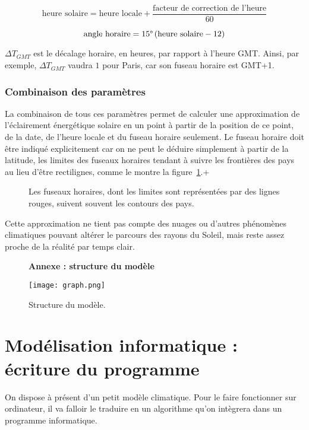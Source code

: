 \documentclass[12pt]{article}
\begin{document}
\[
	\text{heure solaire} = \text{heure locale} + \frac{\text{facteur de correction de l'heure}}{60}
\]

\[
	\text{angle horaire} = 15 \degree \left(
		\text{heure solaire} - 12
	\right)
\]

$\Delta T_{GMT}$ est le décalage horaire, en heures, par rapport à l'heure GMT. Ainsi, par exemple, $\Delta T_{GMT}$ vaudra $1$ pour Paris, car son fuseau horaire est GMT+1.

\subsubsection{Combinaison des paramètres}
La combinaison de tous ces paramètres permet de calculer une approximation de l'éclairement énergétique solaire en un point à partir de la position de ce point, de la date, de l'heure locale et du fuseau horaire seulement.
Le fuseau horaire doit être indiqué explicitement car on ne peut le déduire simplement à partir de la latitude, les limites des fuseaux horaires tendant à suivre les frontières des pays au lieu d'être rectilignes, comme le montre la figure~\ref{fig:timezones}.+

\begin{figure}[!ht]
  \centering
  \caption{Les fuseaux horaires, dont les limites sont représentées par des lignes rouges, suivent souvent les contours des pays.}
  \label{fig:timezones}
\end{figure}

Cette approximation ne tient pas compte des nuages ou d'autres phénomènes climatiques pouvant altérer le parcours des rayons du Soleil, mais reste assez proche de la réalité par temps clair.

\clearpage
\begin{figure}[!htb]
	\centering
	{ \Large \textbf{Annexe : structure du modèle} \par\medskip }
	\centerline{\texttt{[image: graph.png]}}
	\caption{Structure du modèle.}
	\label{fig:model-structure}
\end{figure}

\clearpage
\section{Modélisation informatique : écriture du programme}

On dispose à présent d'un petit modèle climatique.
Pour le faire fonctionner sur ordinateur, il va falloir le traduire en un algorithme qu'on intègrera dans un programme informatique.
\end{document}
